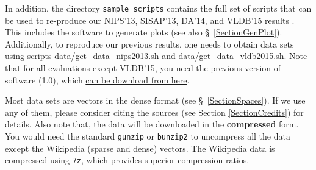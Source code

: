 \documentclass[runningheads,a4paper]{llncs}
\newcommand{\replocfile}{https://github.com/searchivarius/NonMetricSpaceLib/blob/develop/}
\newcommand{\ttt}[1]{\texttt{#1}}
\begin{document}
In addition, the directory \ttt{sample\_scripts} contains the full set of scripts that can be used to re-produce our NIPS'13, SISAP'13, DA'14, and VLDB'15 results \cite{Boytsov_and_Bilegsaikhan:sisap2013,Boytsov_and_Bilegsaikhan:nips2013,ponomarenko2014comparative,naidan2015permutation}.
This includes the software to generate plots (see also \S~\ref{SectionGenPlot}). 
Additionally, to reproduce our previous results, one needs to obtain data sets using scripts
\href{\replocfile data/get_data_nips2013.sh}{data/get\_data\_nips2013.sh} 
and \href{\replocfile data/get_data_vldb2015.sh}{data/get\_data\_vldb2015.sh}. 
Note that for all evaluations except VLDB'15, you need the previous version of software (1.0),
which \href{https://github.com/searchivarius/NonMetricSpaceLib/releases}{can be download from here}.




Most data sets are vectors in the dense format (see \S~\ref{SectionSpaces}).
If we use any of them, please consider citing the sources (see Section \ref{SectionCredits}) for details.
Also note that, the data will be downloaded in the \textbf{compressed} form.
You would need the standard \ttt{gunzip} or \ttt{bunzip2} to uncompress all the data except
the Wikipedia (sparse and dense) vectors.
The Wikipedia data is compressed using \ttt{7z}, which provides 
superior compression ratios.
\end{document}
